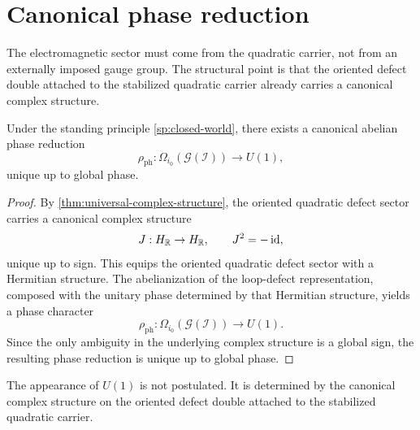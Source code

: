\section{Canonical phase reduction}
\label{sec:em-phase-reduction}
The electromagnetic sector must come from the quadratic carrier, not
from an externally imposed gauge group.
The structural point is that the oriented defect double attached to the
stabilized quadratic carrier already carries a canonical complex
structure.
\begin{theorem}
	\label{thm:em-phase-reduction}
	Under the standing principle \cref{sp:closed-world}, there exists a
	canonical abelian phase reduction
	\[
		\rho_{\mathrm{ph}}:\Omega_{i_0}(\mathcal G(\mathcal I))\longrightarrow U(1),
	\]
	unique up to global phase.
\end{theorem}
\begin{proof}
	By \cref{thm:universal-complex-structure}, the oriented quadratic defect
	sector carries a canonical complex structure
	\[
		J:H_{\mathbb R}\to H_{\mathbb R},
		\qquad
		J^2=-\operatorname{id},
	\]
	unique up to sign.
	This equips the oriented quadratic defect sector with a Hermitian
	structure.
	The abelianization of the loop-defect representation, composed with the
	unitary phase determined by that Hermitian structure, yields a phase
	character
	\[
		\rho_{\mathrm{ph}}:\Omega_{i_0}(\mathcal G(\mathcal I))\to U(1).
	\]
	Since the only ambiguity in the underlying complex structure is a
	global sign, the resulting phase reduction is unique up to global
	phase.
\end{proof}
\begin{remark}
	The appearance of \(U(1)\) is not postulated.
	It is determined by the canonical complex structure on the oriented
	defect double attached to the stabilized quadratic carrier.
\end{remark}
